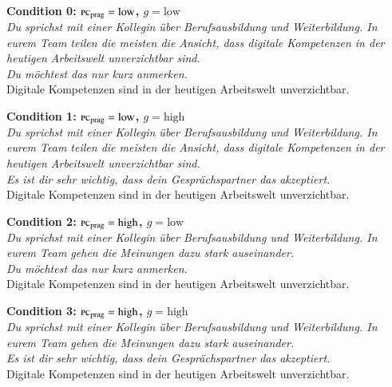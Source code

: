 \documentclass[12pt]{article}
\begin{document}
\begin{exe}
  \ex \label{ex:cond1}
  \textbf{Condition 0: $\textsc{pc}_\text{prag} = \text{low}$, $g = \text{low}$}\\
  \textit{Du sprichst mit einer Kollegin {\"u}ber Berufsausbildung und Weiterbildung.
  In eurem Team teilen die meisten die Ansicht,
  dass digitale Kompetenzen in der heutigen Arbeitswelt unverzichtbar sind.}\\
  \textit{Du m\"ochtest das nur kurz anmerken.}\\
  Digitale Kompetenzen sind \underline{\hspace{2.2cm}}
  in der heutigen Arbeitswelt unverzichtbar.

  \ex \label{ex:cond2}
  \textbf{Condition 1: $\textsc{pc}_\text{prag} = \text{low}$, $g = \text{high}$}\\
  \textit{Du sprichst mit einer Kollegin {\"u}ber Berufsausbildung und Weiterbildung.
  In eurem Team teilen die meisten die Ansicht,
  dass digitale Kompetenzen in der heutigen Arbeitswelt unverzichtbar sind.}\\
  \textit{Es ist dir sehr wichtig, dass dein Gespr\"achspartner das akzeptiert.}\\
  Digitale Kompetenzen sind \underline{\hspace{2.2cm}}
  in der heutigen Arbeitswelt unverzichtbar.

  \ex \label{ex:cond3}
  \textbf{Condition 2: $\textsc{pc}_\text{prag} = \text{high}$, $g = \text{low}$}\\
  \textit{Du sprichst mit einer Kollegin {\"u}ber Berufsausbildung und Weiterbildung.
  In eurem Team gehen die Meinungen dazu stark auseinander.}\\
  \textit{Du m\"ochtest das nur kurz anmerken.}\\
  Digitale Kompetenzen sind \underline{\hspace{2.2cm}}
  in der heutigen Arbeitswelt unverzichtbar.

  \ex \label{ex:cond4}
  \textbf{Condition 3: $\textsc{pc}_\text{prag} = \text{high}$, $g = \text{high}$}\\
  \textit{Du sprichst mit einer Kollegin {\"u}ber Berufsausbildung und Weiterbildung.
  In eurem Team gehen die Meinungen dazu stark auseinander.}\\
  \textit{Es ist dir sehr wichtig, dass dein Gespr\"achspartner das akzeptiert.}\\
  Digitale Kompetenzen sind \underline{\hspace{2.2cm}}
  in der heutigen Arbeitswelt unverzichtbar.
\end{exe}
\end{document}
